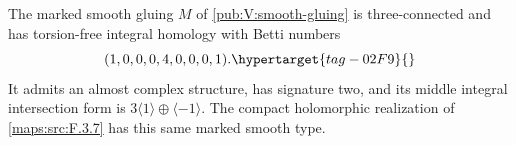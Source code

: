\begin{theorem}
\hypertarget{tag-02NW}{}\label{maps:src:F.2.5}
\hypertarget{tag-02NX}{}\label{maps:src:F.2.6}
\hypertarget{tag-02QL}{}\label{night:P1.12}
The marked smooth gluing $M$ of \cref{pub:V:smooth-gluing} is
three-connected and has torsion-free integral homology with Betti numbers
\begin{equation}
 (1,0,0,0,4,0,0,0,1).
 \hypertarget{tag-02F9}{}\label{maps:eq:F.5}
\end{equation}
It admits an almost complex structure, has signature two, and its
middle integral intersection form is
$3\langle1\rangle\oplus\langle-1\rangle$.
The compact holomorphic realization of \cref{maps:src:F.3.7}
has this same marked smooth type.
\end{theorem}
